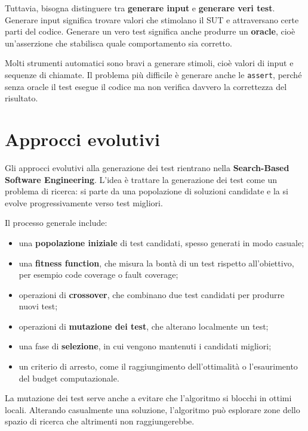 Tuttavia, bisogna distinguere tra \textbf{generare input} e \textbf{generare veri test}. Generare input significa trovare valori che stimolano il SUT e attraversano certe parti del codice. Generare un vero test significa anche produrre un \textbf{oracle}, cioè un'asserzione che stabilisca quale comportamento sia corretto.

\begin{notaprof}
Molti strumenti automatici sono bravi a generare stimoli, cioè valori di input e sequenze di chiamate. Il problema più difficile è generare anche le \texttt{assert}, perché senza oracle il test esegue il codice ma non verifica davvero la correttezza del risultato.
\end{notaprof}

\section{Approcci evolutivi}

Gli approcci evolutivi alla generazione dei test rientrano nella \textbf{Search-Based Software Engineering}. L'idea è trattare la generazione dei test come un problema di ricerca: si parte da una popolazione di soluzioni candidate e la si evolve progressivamente verso test migliori.

Il processo generale include:

\begin{itemize}
    \item una \textbf{popolazione iniziale} di test candidati, spesso generati in modo casuale;
    \item una \textbf{fitness function}, che misura la bontà di un test rispetto all'obiettivo, per esempio code coverage o fault coverage;
    \item operazioni di \textbf{crossover}, che combinano due test candidati per produrre nuovi test;
    \item operazioni di \textbf{mutazione dei test}, che alterano localmente un test;
    \item una fase di \textbf{selezione}, in cui vengono mantenuti i candidati migliori;
    \item un criterio di arresto, come il raggiungimento dell'ottimalità o l'esaurimento del budget computazionale.
\end{itemize}

\begin{notaprof}
La mutazione dei test serve anche a evitare che l'algoritmo si blocchi in ottimi locali. Alterando casualmente una soluzione, l'algoritmo può esplorare zone dello spazio di ricerca che altrimenti non raggiungerebbe.
\end{notaprof}

